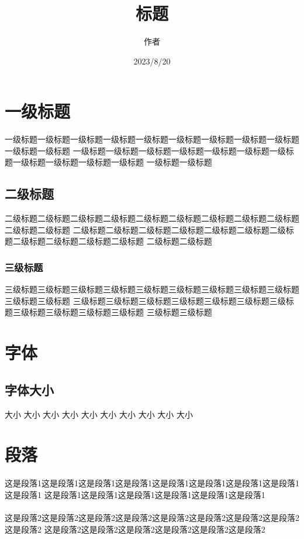 \documentclass{article}
\title{标题}
\author{作者}
\date{2023/8/20}
\begin{document}
\maketitle
\tableofcontents
\newpage

\section{一级标题}
一级标题一级标题一级标题一级标题一级标题一级标题一级标题一级标题一级标题一级标题一级标题
一级标题一级标题一级标题一级标题一级标题一级标题一级标题一级标题一级标题一级标题一级标题
一级标题一级标题
\subsection{二级标题}
二级标题二级标题二级标题二级标题二级标题二级标题二级标题二级标题二级标题二级标题二级标题
二级标题二级标题二级标题二级标题二级标题二级标题二级标题二级标题二级标题二级标题二级标题
二级标题二级标题
\subsubsection{三级标题}
三级标题三级标题三级标题三级标题三级标题三级标题三级标题三级标题三级标题三级标题三级标题
三级标题三级标题三级标题三级标题三级标题三级标题三级标题三级标题三级标题三级标题三级标题
三级标题三级标题

\section{字体}
\subsection{字体大小}
\noindent
\Huge 
大小 
\huge 
大小 
\LARGE 
大小 
\Large 
大小 
\large 
大小 
\normalsize 
大小 
\small 
大小  
\footnotesize 
大小  
\scriptsize 
大小  
\tiny 
大小 
\normalsize

\section{段落}
\paragraph{}
这是段落1这是段落1这是段落1这是段落1这是段落1这是段落1这是段落1这是段落1这是段落1
这是段落1这是段落1这是段落1这是段落1这是段落1这是段落1
\paragraph{}
这是段落2这是段落2这是段落2这是段落2这是段落2这是段落2这是段落2这是段落2这是段落2
这是段落2这是段落2这是段落2这是段落2这是段落2这是段落2
\end{document}
